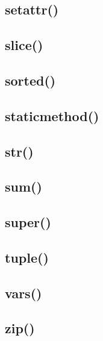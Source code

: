 \documentclass{article}
\begin{document}
\subsection{setattr()}
%

\subsection{slice()}
%

\subsection{sorted()}
%

\subsection{staticmethod()}
%

\subsection{str()}
%

\subsection{sum()}
%

\subsection{super()}
%

\subsection{tuple()}
%

\subsection{vars()}
%

\subsection{zip()}
%
\end{document}
